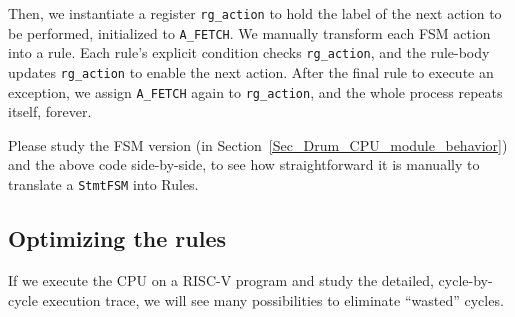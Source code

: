 Then, we instantiate a register \verb|rg_action| to hold the label of
the next action to be performed, initialized to \verb|A_FETCH|.  We
manually transform each FSM action into a rule.  Each rule's explicit
condition checks \verb|rg_action|, and the rule-body updates
\verb|rg_action| to enable the next action.  After the final rule to
execute an exception, we assign \verb|A_FETCH| again to
\verb|rg_action|, and the whole process repeats itself, forever.


Please study the FSM version (in
Section~\ref{Sec_Drum_CPU_module_behavior}) and the above code
side-by-side, to see how straightforward it is manually to translate a
\verb|StmtFSM| into Rules.


\subsection{Optimizing the {\DRUM} rules}

\label{Sec_Optimiizing_Drum_Rules}

If we execute the {\DRUM} CPU on a RISC-V program and study the detailed,
cycle-by-cycle execution trace, we will see many possibilities to
eliminate ``wasted'' cycles.

